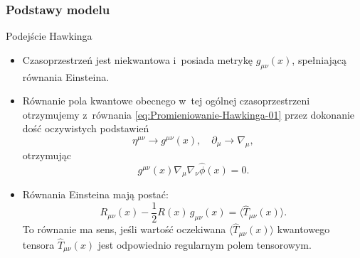 \documentclass[10pt,t]{beamer}
\begin{document}
\begin{frame}
  \frametitle{Podstawy modelu}


  Podejście Hawkinga
  \begin{itemize}
    \RaggedRight

  \item Czasoprzestrzeń jest niekwantowa i~posiada metrykę
    $g_{ \mu \nu }( x )$, spełniającą równania Einsteina.

  \item Równanie pola kwantowe obecnego w~tej ogólnej
    czasoprzestrzeni otrzymujemy z~równania
    \eqref{eq:Promieniowanie-Hawkinga-01} przez dokonanie dość
    oczywistych podstawień
    \begin{equation}
      \label{eq:Promieniowanie-Hawkinga-02}
      \eta^{ \mu \nu } \to g^{ \mu \nu }( x ), \quad
      \partial_{ \mu } \to \nabla_{ \mu },
    \end{equation}
    otrzymując
    \begin{equation}
      \label{eq:Promieniowanie-Hawkinga-03}
      g^{ \mu \nu }( x ) \nabla_{ \mu } \nabla_{ \nu }
      \widehat{ \phi }( x ) = 0.
    \end{equation}

  \item Równania Einsteina mają postać:
    \begin{equation}
      \label{eq:Promieniowanie-Hawkinga-04}
      R_{ \mu \nu }( x ) - \frac{ 1 }{ 2 } R( x )\, g_{ \mu \nu }( x )
      = \langle \widehat{ T }_{ \mu \nu }( x ) \rangle.
    \end{equation}
    To równanie ma sens, jeśli wartość oczekiwana
    $\langle \widehat{ T }_{ \mu \nu }( x ) \rangle$ kwantowego
    tensora $\widehat{ T }_{ \mu \nu }( x )$ jest odpowiednio
    regularnym polem tensorowym.
  \end{itemize}

\end{frame}
\end{document}
